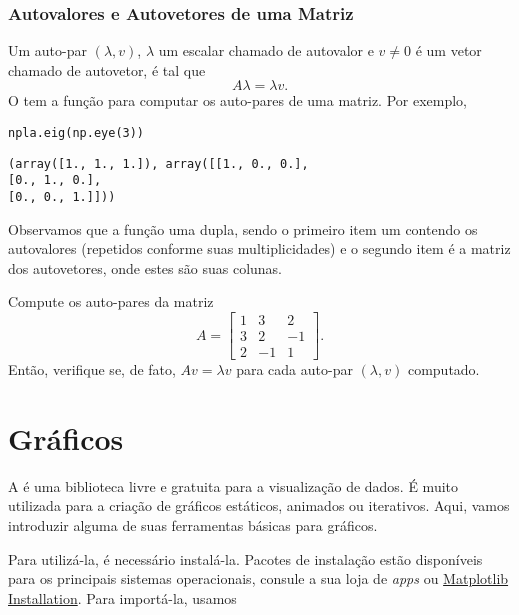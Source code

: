 \documentclass[a4paper,10pt,twoside]{article}
\begin{document}
\subsubsection{Autovalores e Autovetores de uma Matriz}

Um auto-par $(\lambda, v)$, $\lambda$ um escalar chamado de autovalor e $v\neq 0$ é um vetor chamado de autovetor, é tal que
\begin{equation}
  A\lambda = \lambda v.
\end{equation}
O {\PYTHONnumpy} tem a função {\PYTHONnumpyDOTlinalgDOTeig} para computar os auto-pares de uma matriz. Por exemplo,

\begin{lstlisting}
npla.eig(np.eye(3))
\end{lstlisting}

\begin{verbatim}
(array([1., 1., 1.]), array([[1., 0., 0.],
[0., 1., 0.],
[0., 0., 1.]]))
\end{verbatim}

Observamos que a função uma dupla, sendo o primeiro item um {\PYTHONnumpyDOTarray} contendo os autovalores (repetidos conforme suas multiplicidades) e o segundo item é a matriz dos autovetores, onde estes são suas colunas.

\begin{exr}
  Compute os auto-pares da matriz
  \begin{equation}
    A =
    \begin{bmatrix}
      1 & 3 & 2\\
      3 & 2 & -1\\
      2 & -1 & 1
    \end{bmatrix}.
  \end{equation}
  Então, verifique se, de fato, $Av = \lambda v$ para cada auto-par $(\lambda, v)$ computado.
\end{exr}

\section{Gráficos}\label{sec_graf}

A {\PYTHONmatplotlib} é uma biblioteca {\python} livre e gratuita para a visualização de dados. É muito utilizada para a criação de gráficos estáticos, animados ou iterativos. Aqui, vamos introduzir alguma de suas ferramentas básicas para gráficos.

Para utilizá-la, é necessário instalá-la. Pacotes de instalação estão disponíveis para os principais sistemas operacionais, consule a sua loja de {\it apps} ou \href{https://matplotlib.org/stable/users/installing.html}{Matplotlib Installation}. Para importá-la, usamos
\end{document}
